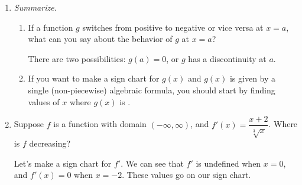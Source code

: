 \documentclass{article}
\begin{document}
\begin{enumerate}[resume]
\begin{enumerate}
  \end{enumerate}

\item  \emph{Summarize.}

  \begin{enumerate}
  \item

    \begin{problem}[0.5in]
      If a function $g$ switches from positive to negative or vice versa at $x = a$, what can you say about the behavior of $g$ at $x = a$?
    \end{problem}

    \begin{solution}
      There are two possibilities: $g(a) = 0$, or $g$ has a discontinuity at $a$.
    \end{solution}

  \item


    \begin{problem}[0.15in]
      If you want to make a sign chart for $g(x)$ and $g(x)$ is given by a single (non-piecewise) algebraic formula, you should start by finding values of $x$ where $g(x)$ is . 
    \end{problem}

  \end{enumerate}

\item 

  \begin{problem}[\vfill]
    Suppose $f$ is a function with domain $(-\infty, \infty)$, and $f'(x) = \dfrac{x + 2}{\sqrt[3]{x}}$. Where is $f$ decreasing?
  \end{problem}

  \begin{solution}
    Let's make a sign chart for $f'$. We can see that $f'$ is undefined when $x=0$, and
    $f'(x)=0$ when $x=-2$. These values go on our sign chart.


\end{solution}
\end{enumerate}
\end{document}
